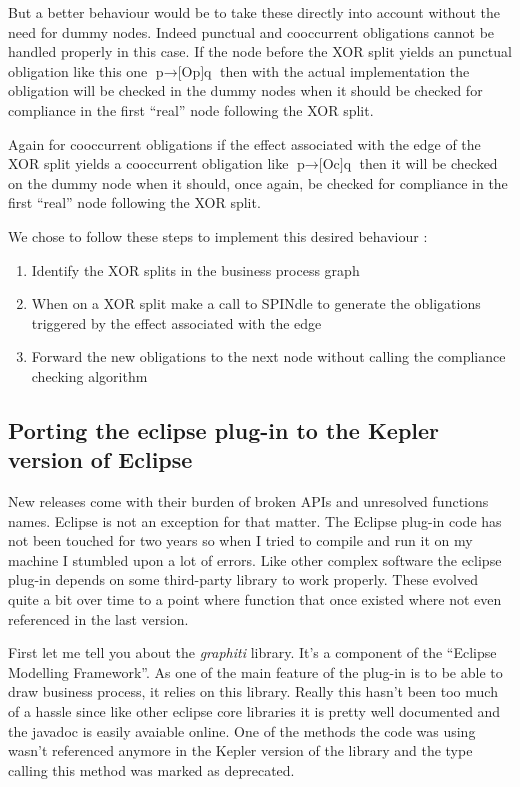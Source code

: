 \documentclass[10pt]{report}
\begin{document}
But a better behaviour would be to take these directly into account without the need for dummy nodes. Indeed punctual and cooccurrent obligations cannot be handled properly in this case. If the node before the XOR split yields an punctual obligation like this one $\text{p} \rightarrow \text{[Op]q}$ then with the actual implementation the obligation will be checked in the dummy nodes when it should be checked for compliance in the first \enquote{real} node following the XOR split.

Again for cooccurrent obligations if the effect associated with the edge of the XOR split yields a cooccurrent obligation like $\text{p} \rightarrow \text{[Oc]q}$ then it will be checked on the dummy node when it should, once again, be checked for compliance in the first \enquote{real} node following the XOR split.

We chose to follow these steps to implement this desired behaviour :
\begin{enumerate}
\item Identify the XOR splits in the business process graph
\item When on a XOR split make a call to SPINdle to generate the obligations triggered by the effect associated with the edge
\item Forward the new obligations to the next node without calling the compliance checking algorithm
\end{enumerate}


\subsection{Porting the eclipse plug-in to the Kepler version of Eclipse}

New releases come with their burden of broken APIs and unresolved functions names. Eclipse is not an exception for that matter. The Eclipse plug-in code has not been touched for two years so when I tried to compile and run it on my machine I stumbled upon a lot of errors. Like other complex software the eclipse plug-in depends on some third-party library to work properly. These evolved quite a bit over time to a point where function that once existed where not even referenced in the last version.

First let me tell you about the \textit{graphiti} library. It's a component of the \enquote{Eclipse Modelling Framework}. As one of the main feature of the plug-in is to be able to draw business process, it relies on this library. Really this hasn't been too much of a hassle since like other eclipse core libraries it is pretty well documented and the javadoc is easily avaiable online. One of the methods the code was using wasn't referenced anymore in the Kepler version of the library and the type calling this method was marked as deprecated. 
\end{document}
